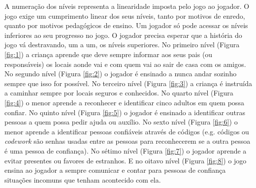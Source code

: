A numeração dos níveis representa a linearidade imposta pelo jogo ao jogador. O jogo exige um cumprimento linear dos seus níveis, tanto por motivos de enredo, quanto por motivos pedagógicos de ensino. Um jogador só pode acessar os níveis inferiores ao seu progresso no jogo. O jogador precisa esperar que a história do jogo vá destravando, um a um, os níveis superiores. No primeiro nível (Figura \ref{fig:1}) a criança aprende que deve sempre informar aos seus pais (ou responsáveis) os locais aonde vai e com quem vai ao sair de casa com os amigos. No segundo nível (Figura \ref{fig:2}) o jogador é ensinado a nunca andar sozinho sempre que isso for possível. No terceiro nível (Figura \ref{fig:3}) a criança é instruída a caminhar sempre por locais seguros e conhecidos. No quarto nível (Figura \ref{fig:4}) o menor aprende a reconhecer e identificar cinco adultos em quem possa confiar. No quinto nível (Figura \ref{fig:5}) o jogador é ensinado a identificar outras pessoas a quem possa pedir ajuda ou auxílio. No sexto nível (Figura \ref{fig:6}) o menor aprende a identificar pessoas confiáveis através de códigos (e.g. códigos ou \textit{codework} são senhas usadas entre as pessoas para reconhecerem se a outra pessoa é uma pessoa de confiança). No sétimo nível (Figura \ref{fig:7}) o jogador aprende a evitar presentes ou favores de estranhos. E no oitavo nível (Figura \ref{fig:8}) o jogo ensina ao jogador a sempre comunicar e contar para pessoas de confiança situações incomuns que tenham acontecido com ela. 




